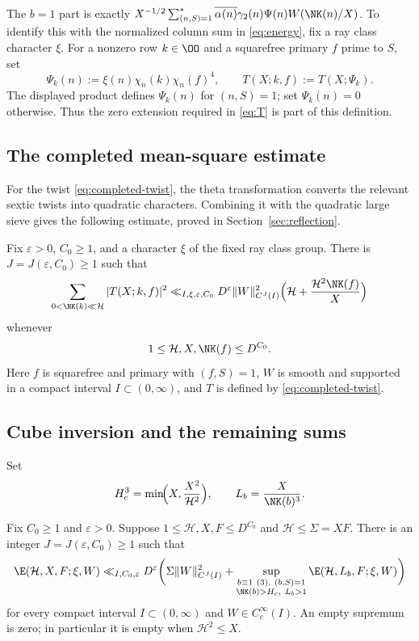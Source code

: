 The $b=1$ part is exactly
$X^{-1/2}\sum_{(n,S)=1}^*\overline{\alpha(n)}\gamma_2(n)\Psi(n)W(\NK(n)/X)$.
To identify this with the normalized column sum in \eqref{eq:energy},
fix a ray class character $\xi$. For a nonzero row $k\in\OO$ and a
squarefree primary $f$ prime to $S$, set
\begin{equation}\label{eq:completed-twist}
 \Psi_k(n):=\xi(n)\chi_n(k)\chi_n(f)^4,
 \qquad T(X;k,f):=T(X;\Psi_k).
\end{equation}
The displayed product defines $\Psi_k(n)$ for $(n,S)=1$; set $\Psi_k(n)=0$ otherwise. Thus the zero extension required in \eqref{eq:T} is part of this definition.


\subsection{The completed mean-square estimate}
For the twist \eqref{eq:completed-twist}, the theta transformation converts
the relevant sextic twists into quadratic characters. Combining it with
the quadratic large sieve gives the following estimate, proved in
Section~\ref{sec:reflection}.

\begin{proposition}\label{prop:R}
Fix $\varepsilon>0$, $C_0\ge1$, and a character $\xi$ of the fixed ray
class group. There is $J=J(\varepsilon,C_0)\ge1$ such that
\begin{equation}\label{eq:R}
 \sum_{0<\NK(k)\ll\mathcal H}|T(X;k,f)|^2
 \ll_{I,\xi,\varepsilon,C_0}
 D^\varepsilon\|W\|_{C^J(I)}^2
 \Bigl(\mathcal H+\frac{\mathcal H^2\NK(f)}{X}\Bigr)
\end{equation}
whenever
\[
 1\le\mathcal H,X,\NK(f)\le D^{C_0}.
\]
Here $f$ is squarefree and primary with $(f,S)=1$,
$W$ is smooth and supported in a compact interval $I\subset(0,\infty)$,
and $T$ is defined by \eqref{eq:completed-twist}.
\end{proposition}
\subsection{Cube inversion and the remaining sums}
Set
\begin{equation}\label{eq:cube-cutoff}
 H_c^3=\min\!\Bigl(X,\frac{X^2}{\mathcal H^2}\Bigr),
 \qquad L_b=\frac{X}{\NK(b)^3}.
\end{equation}

\begin{lemma}\label{lem:cube-reduction}
Fix $C_0\ge1$ and $\varepsilon>0$. Suppose
$1\le\mathcal H,X,F\le D^{C_0}$ and $\mathcal H\le\Sigma=XF$.
There is an integer $J=J(\varepsilon,C_0)\ge1$ such that
\begin{equation}\label{eq:cube-reduction}
 \E(\mathcal H,X,F;\xi,W)
 \ll_{I,C_0,\varepsilon}D^\varepsilon
 \biggl(\Sigma\|W\|_{C^J(I)}^2+
 \sup_{\substack{b\equiv1\ (3),\ (b,S)=1\\
                  \NK(b)>H_c,\ L_b>1}}
       \E(\mathcal H,L_b,F;\xi,W)\biggr)
\end{equation}
for every compact interval $I\subset(0,\infty)$ and
$W\in C_c^\infty(I)$. An empty supremum is zero; in particular it
is empty when $\mathcal H^2\le X$.
\end{lemma}

